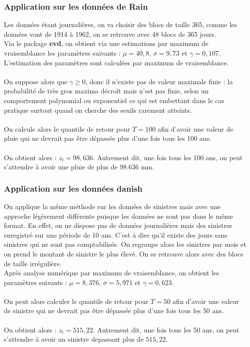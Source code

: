 \documentclass{article}
\theoremstyle{plain}
\theoremstyle{definition}
\theoremstyle{plain}
\begin{document}
\subsubsection{Application sur les données de Rain}

\noindent Les données étant journalières, on va choisir des blocs de taille 365, comme les données vont de 1914 à 1962, on se retrouve avec 48 blocs de 365 jours.
\\
Via le package \textbf{evd}, on obtient via une estimations par maximum de vraisemblance les paramètres suivants : $\mu = 40,8$, $\sigma = 9,73$ et $\gamma = 0,107$.
\\
L'estimation des paramètres sont calculées par maximum de vraisemblance.
\\
\\
On suppose alors que $\gamma \geq 0$, donc il n’existe pas de valeur maximale finie : la probabilité de très gros maxima décroît mais n'est pas finie, selon un comportement polynomial ou exponentiel ce qui est embettant dans le cas pratique surtout quand on cherche des seuils rarement atteints.
\\
\\
On calcule alors le quantile de retour pour $T=100$ afin d'avoir une valeur de pluie qui ne devrait pas être dépassée plus d'une fois tous les 100 ans.
\\
\\
On obtient alors : $z_t = 98,636$. Autrement dit, une fois tous les 100 ans, on peut s'attendre à avoir une pluie de plus de 98.636 mm.




\subsubsection{Application sur les données danish}
\noindent On applique la même méthode sur les données de sinistres mais avec une approche légèrement différente puisque les données ne sont pas dans le même format. En effet, on ne dispose pas de données journalières mais des sinistres enregistré sur une période de 10 ans. C'est à dire qu'il existe des jours sans sinistres qui ne sont pas comptabilisés.
On regroupe alors les sinistres par mois et on prend le montant de sinistre le plus élevé. On se retrouve alors avec des blocs de taille irrégulière.
\\
Après analyse numérique par maximum de vraisemblance, on obtient les paramètres suivants : $\mu = 8,376$, $\sigma = 5,971$ et $\gamma = 0,623$.
\\
\\
On peut alors calculer le quantile de retour pour $T=50$ afin d'avoir une valeur de sinistre qui ne devrait pas être dépassée plus d'une fois tous les 50 ans.
\\
\\
On obtient alors : $z_t = 515,22$. Autrement dit, une fois tous les 50 ans, on peut s'attendre à avoir un sinistre depassant plus de $515,22$.
\end{document}
